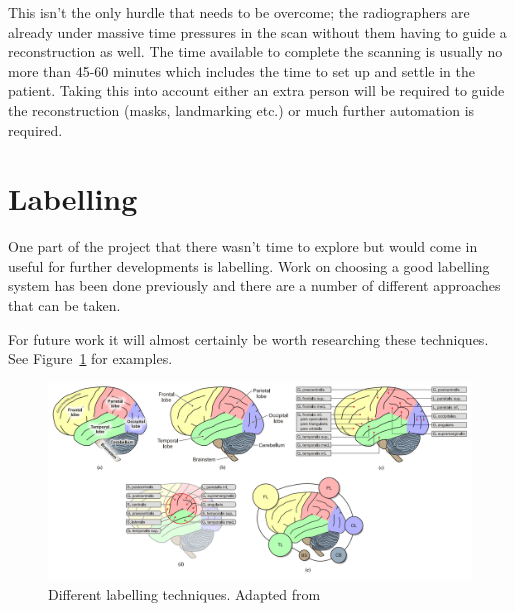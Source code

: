 This isn't the only hurdle that needs to be overcome; the radiographers are already under massive time pressures in the scan without them having to guide a reconstruction as well. The time available to complete the scanning is usually no more than 45-60 minutes which includes the time to set up and settle in the patient. Taking this into account either an extra person will be required to guide the reconstruction (masks, landmarking etc.) or much further automation is required.

\newpage
\section{Labelling}\label{background:labelling}
One part of the project that there wasn't time to explore but would come in useful for further developments is labelling. Work on choosing a good labelling system has been done previously and there are a number of different approaches that can be taken\cite{labelling}.

For future work it will almost certainly be worth researching these techniques. See Figure~\ref{fig:labels} for examples.

\begin{figure}[H]
    \centering
	\includegraphics[width=1.0\textwidth]{images/background/labels.png}
    \caption{Different labelling techniques. Adapted from \cite{labelling}}
    \label{fig:labels}
\end{figure}